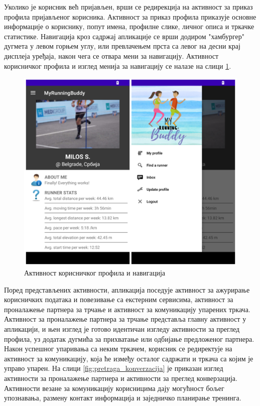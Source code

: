 \documentclass[12pt,oneside]{memoir}
\begin{document}
Уколико је корисник већ пријављен, врши се редирекција на активност за приказ профила пријављеног корисника. Активност за приказ профила приказује основне информације о кориснику, попут имена, профилне слике, личног описа и тркачке статистике. Навигација кроз садржај апликације се врши додиром "хамбургер" дугмета у левом горњем углу, или превлачењем прста са левог на десни крај дисплеја уређаја, након чега се отвара мени за навигацију. Активност корисничког профила и изглед менија за навигацију се налазе на слици \ref{fig:profil_meni}.

\begin{figure}[!ht]
  \centering
  \includegraphics[scale=0.7]{slike/profil-meni.png}
  \caption{Активност корисничког профила и навигација}
  \label{fig:profil_meni}
\end{figure}

Поред представљених активности, апликација поседује активност за ажурирање корисничких података и повезивање са екстерним сервисима, активност за проналажење партнера за трчање и активност за комуникацију упарених тркача. Активност за проналажење партнера за трчање представља главну активност у апликацији, и њен изглед је готово идентичан изгледу активности за преглед профила, уз додатак дугмића за прихватање или одбијање предложеног партнера. Након успешног упаривања са неким тркачем, корисник се редиректује на активност за комуникацију, која ће између осталог садржати и тркача са којим је управо упарен. На слици \ref{fig:pretraga_konverzacija} је приказан изглед активности за проналажење партнера и активности за преглед конверзација. Активности везане за комуникацију корисницима дају могућност бољег упознавања, размену контакт информација и заједничко планирање тренинга.
\end{document}
